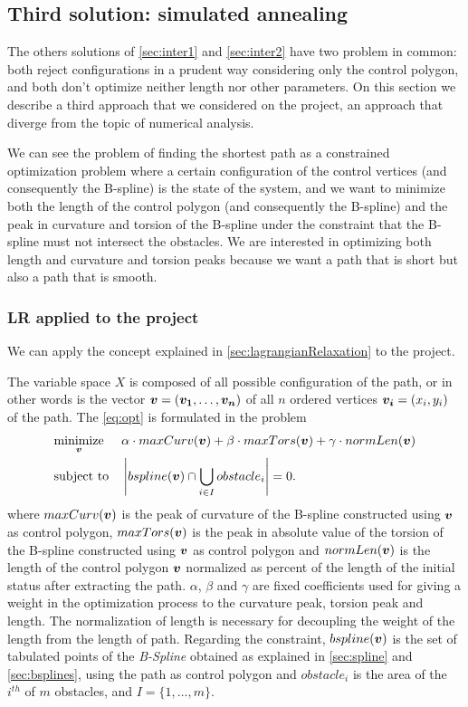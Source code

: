 \documentclass[dissertation.tex]{subfiles}
\begin{document}
\subsection{Third solution: simulated annealing}\label{sec:inter3}
The others solutions of \cref{sec:inter1} and \cref{sec:inter2} have two
problem in common: both reject configurations in a prudent way
considering only the control polygon, and both don't optimize neither
length nor other parameters. On this section we describe a third
approach that we considered on the project, an approach that diverge
from the topic of numerical analysis.

We can see the problem of finding the shortest path as a constrained
optimization problem where a certain configuration of the control
vertices (and
consequently the B-spline) is the state of the system, and we want to
minimize both the length of the control polygon (and consequently the
B-spline) and the peak in curvature and torsion of the B-spline under
the constraint that the B-spline must not intersect the obstacles. We
are interested in optimizing both length and curvature and torsion
peaks because we want a path that is short but also a path that is
smooth.

\subsubsection{\acf{LR} applied to the project}
We can apply the concept explained in \cref{sec:lagrangianRelaxation}
to the project.

The variable space $X$ is composed of all possible
configuration of the path, or in other words is the vector
$\boldsymbol{v}=(\boldsymbol{v_1},\dots,\boldsymbol{v_n})$ of all $n$ ordered
vertices $\boldsymbol{v_i}=(x_i,y_i)$ of the
path. The \cref{eq:opt} is formulated in the problem
\begin{equation*}
  \begin{aligned}
    & \underset{\boldsymbol{v}}{\text{minimize}}
    & & \alpha\cdot maxCurv(\boldsymbol{v})+\beta\cdot
    maxTors(\boldsymbol{v})+\gamma\cdot normLen(\boldsymbol{v}) \\
    & \text{subject to}
    & & \left|bspline(\boldsymbol{v})\cap \bigcup_{i\in I}obstacle_i\right| = 0.
  \end{aligned}
\end{equation*}
where $maxCurv(\boldsymbol{v})$ is the peak of curvature of the B-spline
constructed using $\boldsymbol{v}$ as control polygon,
$maxTors(\boldsymbol{v})$ is the peak in absolute value of the torsion of
the B-spline constructed using $\boldsymbol{v}$ as control polygon and
$normLen(\boldsymbol{v})$ is the length of the control polygon
$\boldsymbol{v}$ normalized as percent of the length of the initial status
after extracting the path. $\alpha$, $\beta$ and $\gamma$ are fixed
coefficients used for giving a weight in the optimization process to
the curvature peak, torsion peak and length. The normalization of
length is necessary for decoupling the weight of the length from the
length of path. Regarding the constraint, $bspline(\boldsymbol{v})$
is the set of tabulated points of the \emph{B-Spline} obtained as
explained in
\cref{sec:spline} and \cref{sec:bsplines}, using the path as
control polygon and
$obstacle_i$ is the area of the $i^{th}$ of $m$ obstacles, and
$I=\{1,\dots,m\}$.
\end{document}
